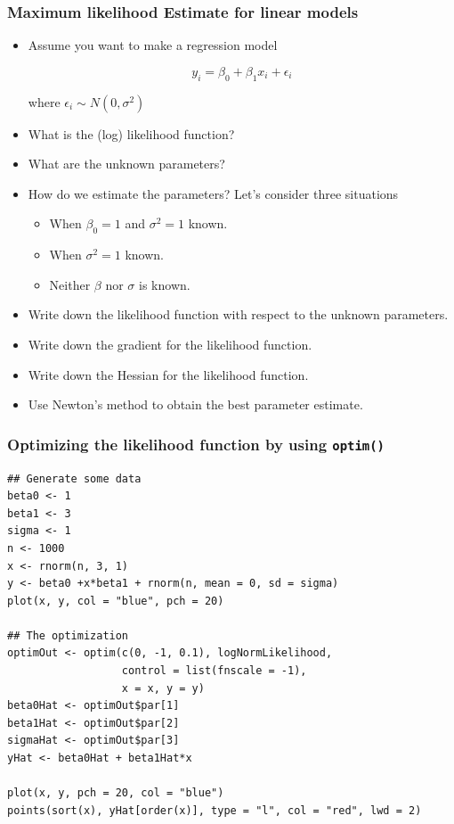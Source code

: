 \documentclass[10pt]{beamer}
\begin{document}
\begin{frame}
  \frametitle{Maximum likelihood Estimate for linear models}

  \begin{itemize}
  \item Assume you want to make a regression model

    \begin{equation*}
      y_i = \beta_0 + \beta_1 x_i + \epsilon_i
    \end{equation*}

    where $\epsilon_i \sim N(0, \sigma^2)$

  \item What is the (log) likelihood function?

  \item What are the unknown parameters?

  \item How do we estimate the parameters? Let's consider three situations


    \begin{itemize}
    \item When $\beta_0=1$ and $\sigma^2=1$ known.
    \item When $\sigma^2=1$ known.
    \item Neither $\beta$ nor $\sigma$ is known.
    \end{itemize}

  \item Write down the likelihood function with respect to the
    unknown parameters.

  \item Write down the gradient for the likelihood function.

  \item Write down the Hessian for the likelihood function.

  \item Use Newton's method to obtain the best parameter estimate.

  \end{itemize}

\end{frame}

\begin{frame}[fragile]
  \frametitle{Optimizing the likelihood function by using \texttt{optim()}}

\begin{verbatim}
## Generate some data
beta0 <- 1
beta1 <- 3
sigma <- 1
n <- 1000
x <- rnorm(n, 3, 1)
y <- beta0 +x*beta1 + rnorm(n, mean = 0, sd = sigma)
plot(x, y, col = "blue", pch = 20)

## The optimization
optimOut <- optim(c(0, -1, 0.1), logNormLikelihood,
                  control = list(fnscale = -1),
                  x = x, y = y)
beta0Hat <- optimOut$par[1]
beta1Hat <- optimOut$par[2]
sigmaHat <- optimOut$par[3]
yHat <- beta0Hat + beta1Hat*x

plot(x, y, pch = 20, col = "blue")
points(sort(x), yHat[order(x)], type = "l", col = "red", lwd = 2)
\end{verbatim}
\end{frame}
\end{document}
